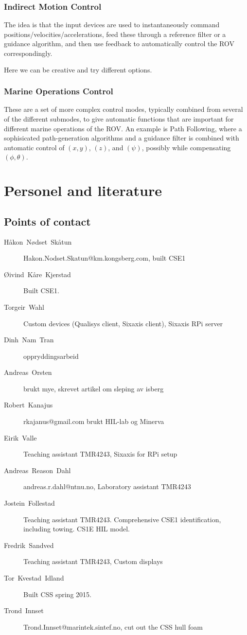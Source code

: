\documentclass[a4paper,twoside,english]{report}
\begin{document}
\subsection{Indirect Motion Control}

The idea is that the input devices are used to instantaneously command
positions/velocities/accelerations, feed these through a reference
filter or a guidance algorithm, and then use feedback to automatically
control the ROV correspondingly.

Here we can be creative and try different options.

\subsection{\label{subsec:Marine-Operations-Control}Marine Operations Control}

These are a set of more complex control modes, typically combined
from several of the different submodes, to give automatic functions
that are important for different marine operations of the ROV. An
example is Path Following, where a sophisicated path-generation algorithms
and a guidance filter is combined with automatic control of $(x,y)$,
$(z)$, and $(\psi)$, possibly while compensating $(\phi,\theta)$.

\chapter{Personel and literature}

\section{Points of contact}
\begin{description}
\item [{Håkon~Nødset~Skåtun}] Hakon.Nodset.Skatun@km.kongsberg.com, built
CSE1
\item [{Øivind~Kåre~Kjerstad}] Built CSE1.
\item [{Torgeir~Wahl}] Custom devices (Qualisys client, Sixaxis client),
Sixaxis RPi server
\item [{Dinh~Nam~Tran}] oppryddingsarbeid
\item [{Andreas~Orsten}] brukt mye, skrevet artikel om sleping av isberg
\item [{Robert~Kanajus}] rkajanus@gmail.com brukt HIL-lab og Minerva
\item [{Eirik~Valle}] Teaching assistant TMR4243, Sixaxis for RPi setup
\item [{Andreas~Reason~Dahl}] andreas.r.dahl@ntnu.no, Laboratory assistant
TMR4243
\item [{Jostein~Follestad}] Teaching assistant TMR4243. Comprehensive
CSE1 identification, including towing. CS1E HIL model.
\item [{Fredrik~Sandved}] Teaching assistant TMR4243, Custom displays
\item [{Tor~Kvestad~Idland}] Built CSS spring 2015.
\item [{Trond~Innset}] Trond.Innset@marintek.sintef.no, cut out the CSS
hull foam
\end{description}
\FloatBarrier
\end{document}
